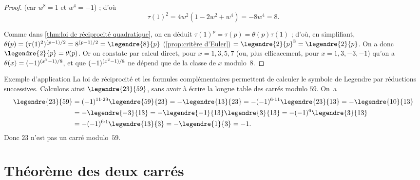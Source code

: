 \documentclass[11pt, useosf,
  title in boldface,
  theorem in new line,
  theorem numbering = section,
  number theorems separately,
]{simplivre}
\begin{document}
\begin{proof}
        \vspace{-1.2\baselineskip}\par\noindent%
        (car \( w^8=1 \) et \( w^4=-1 \)) ; d'où
        \vspace{-.2\baselineskip}%
        \[
            \tau(1)^2 = 4w^2(1-2w^2+w^4) = -8w^4 = 8.
        \]
        \par\vspace{-.2\baselineskip}\noindent{}%
        Comme dans \cref{thm:loi de réciprocité quadratique}, on en déduit \( \tau(1)^p = \tau(p) = \theta(p)\tau(1) \) ; d'où, en simplifiant, \( \theta(p) = (\tau(1)^2)^{(p-1)/2} = 8^{(p-1)/2} = \legendre{8}{p} \) (\cref{prop:critère d'Euler}) \( = \legendre{2}{p}^3 = \legendre{2}{p} \). On a donc \( \legendre{2}{p} = \theta(p) \). Or on constate par calcul direct, pour \( x = 1,3,5,7 \) (ou, plus efficacement, pour \( x = 1,3,-3,-1 \)) qu'on a \( \theta(x) = (-1)^{\smash{(x^2-1)}/8} \), et que \( (-1)^{\smash{(x^2-1)}/8} \) ne dépend que de la classe de \( x \) modulo~\( 8 \).
    \end{proof}

    \begin{theorem-with-name}{Exemple d'application}
        La loi de réciprocité et les formules complémentaires permettent de calculer le symbole de Legendre par réductions successives. Calculons ainsi \( \legendre{23}{59} \), sans avoir à écrire la longue table des carrés modulo \( 59 \). On~a
        \begin{align*}
            \legendre{23}{59} &= (-1)^{11 \cdot 29}\legendre{59}{23} = - \legendre{13}{23} = -(-1)^{6 \cdot 11} \legendre{23}{13} = - \legendre{10}{13}\\
            &= -\legendre{-3}{13} = -\legendre{-1}{13} \legendre{3}{13} = -(-1)^6 \legendre{3}{13}\\
            &= - (-1)^{6 \cdot 1} \legendre{13}{3} = -\legendre{1}{3} = -1.
        \end{align*}
        Donc \( 23 \) n'est pas un carré modulo~\( 59 \).
    \end{theorem-with-name}

\section{Théorème des deux carrés}\label{sec:théorème des deux carrés}
\end{document}

